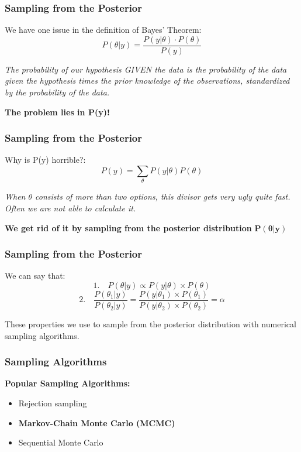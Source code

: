 \documentclass{beamer}
\begin{document}
\begin{frame}
    \frametitle{Sampling from the Posterior}
    We have one issue in the definition of Bayes' Theorem:
    \[
    P(\theta|y) = \frac{P(y|\theta) \cdot P(\theta)}{P(y)}
    \]
    \vspace{0.2cm}

    \textit{The probability of our hypothesis GIVEN the data is the probability of the data given the hypothesis times the prior knowledge of the observations, standardized by the probability of the data.}
    \vspace{0.2cm}

    \textbf{The problem lies in P(y)!}
\end{frame}

\begin{frame}
    \frametitle{Sampling from the Posterior}
    Why is P(y) horrible?:
    \[
    P(y) = \sum_\theta P(y|\theta) P(\theta)
    \]
    \vspace{0.2cm}

    \textit{When $\theta$ consists of more than two options, this divisor gets very ugly quite fast. Often we are not able to calculate it.}
    \vspace{0.2cm}

    \textbf{We get rid of it by sampling from the posterior distribution} $\mathbf{P(\theta|y)}$
\end{frame}

\begin{frame}
    \frametitle{Sampling from the Posterior}
    \large
    We can say that:
    \[
    1.\quad P(\theta|y) \propto P(y|\theta) \times P(\theta)
    \]
    \[
    2.\quad \frac{P(\theta_1|y)}{P(\theta_2|y)} = \frac{P(y|\theta_1) \times P(\theta_1)}{P(y|\theta_2) \times P(\theta_2)} = \alpha
    \]
    \vspace{0.2cm}
    
    These properties we use to sample from the posterior distribution with numerical sampling algorithms.
\end{frame}

\begin{frame}
    \frametitle{Sampling Algorithms}
    \Large
    \textbf{Popular Sampling Algorithms:}
    \vspace{0.2cm}
    
    \begin{itemize}
        \item Rejection sampling
        \item \textbf{Markov-Chain Monte Carlo (MCMC)}
        \item Sequential Monte Carlo
    \end{itemize}
\end{frame}
\end{document}
